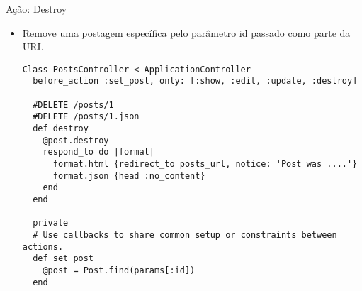 \begin{frame}{Ação: Destroy}
	\begin{itemize}
		\item Remove uma postagem específica pelo parâmetro \alert{id} passado como parte da URL
		\begin{lstlisting}[style=RubyInputStyle, caption=posts\_controller.rb]
Class PostsController < ApplicationController
  before_action :set_post, only: [:show, :edit, :update, :destroy]

  #DELETE /posts/1
  #DELETE /posts/1.json 
  def destroy
    @post.destroy
    respond_to do |format|
      format.html {redirect_to posts_url, notice: 'Post was ....'} 
      format.json {head :no_content}
    end
  end 

  private
  # Use callbacks to share common setup or constraints between actions.
  def set_post 
    @post = Post.find(params[:id])
  end 
		\end{lstlisting}		
	\end{itemize}	
\end{frame}